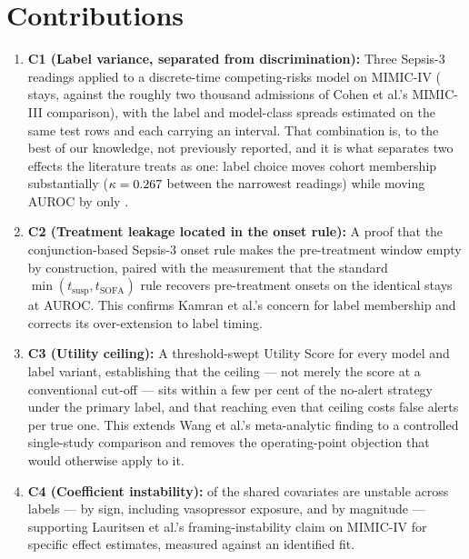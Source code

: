 \section{Contributions}

\begin{enumerate}
    \item \textbf{C1 (Label variance, separated from discrimination):} Three
    Sepsis-3 readings applied to a discrete-time competing-risks model on
    MIMIC-IV (\pcNStays{} stays, against the roughly two thousand admissions of
    Cohen et al.'s MIMIC-III comparison), with the label and model-class
    spreads estimated on the same test rows and each carrying an interval. That
    combination is, to the best of our knowledge, not previously reported, and
    it is what separates two effects the literature treats as one: label choice
    moves cohort membership substantially ($\kappa = 0.267$ between the
    narrowest readings) while moving AUROC by only \pcSpreadLabel.

    \item \textbf{C2 (Treatment leakage located in the onset rule):} A proof that
    the conjunction-based Sepsis-3 onset rule makes the pre-treatment window
    empty by construction, paired with the measurement that the standard
    $\min(t_{\text{susp}}, t_{\text{SOFA}})$ rule recovers
    \pcPreTreatOnsetsVarF{} pre-treatment onsets on the identical stays at
    \pcPreTreatAurocPrimaryF{} AUROC. This confirms Kamran et al.'s
    \cite{kamran2024evaluation} concern for label membership and corrects its
    over-extension to label timing.

    \item \textbf{C3 (Utility ceiling):} A threshold-swept Utility Score for
    every model and label variant, establishing that the ceiling --- not merely
    the score at a conventional cut-off --- sits within a few per cent of the
    no-alert strategy under the primary label, and that reaching even that
    ceiling costs
    \pcUtilityOptBurdenGbtB{} false alerts per true one. This extends Wang et
    al.'s \cite{wang2025srpm} meta-analytic finding to a controlled
    single-study comparison and removes the operating-point objection that
    would otherwise apply to it.

    \item \textbf{C4 (Coefficient instability):} \pcHTwoEst{} of the
    \pcHTwoNTerms{} shared covariates are unstable across labels ---
    \pcHTwoNSign{} by sign, including vasopressor exposure, and \pcHTwoNMag{}
    by magnitude --- supporting Lauritsen et al.'s
    \cite{lauritsen2021framing} framing-instability claim on MIMIC-IV for
    specific effect estimates, measured against an identified fit.


\end{enumerate}
